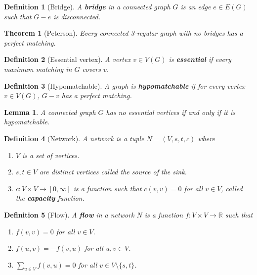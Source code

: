 \documentclass{article}
\newcommand{\R}{\mathbb{R}}
\newcommand{\st}{such that }
\newtheorem*{definition}{Definition}
\newtheorem*{lemma}{Lemma}
\newtheorem*{theorem}{Theorem}
\begin{document}
\begin{definition}[Bridge]
    A \textbf{bridge} in a connected graph $ G $ is an edge $ e \in E(G) $ \st $ G - e $ is disconnected.
\end{definition}

\begin{theorem}[Peterson]
    Every connected 3-regular graph with no bridges has a perfect matching.
\end{theorem}

\begin{definition}[Essential vertex]
    A vertex $ v \in V(G) $ is \textbf{essential} if every maximum matching in $ G $ covers $ v $.
\end{definition}

\begin{definition}[Hypomatchable]
    A graph is \textbf{hypomatchable} if for every vertex $ v \in V(G) $, $ G - v $ has a perfect matching.
\end{definition}

\begin{lemma}
    A connected graph $ G $ has no essential vertices if and only if it is hypomatchable.
\end{lemma}

\begin{definition}[Network]
    A network is a tuple $ N = (V, s, t, c) $ where
    \begin{enumerate}
        \item $ V $ is a set of vertices.
        \item $ s, t \in V $ are distinct vertices called the source of the sink.
        \item $ c: V \times V \to [0, \infty]$ is a function \st $ c(v, v) =0 $ for all $ v \in V $, called the \textbf{capacity} function.
    \end{enumerate}
\end{definition}

\begin{definition}[Flow]
    A \textbf{flow} in a network $ N $ is a function $ f: V \times V \to \R $ \st
    \begin{enumerate}
        \item $ f(v,v) = 0 $ for all $ v \in V $.
        \item $ f(u,v) = -f(v,u) $ for all $ u,v \in V $.
        \item $ \sum_{u \in V}^{}f(v,u) = 0 $ for all $ v \in V \setminus \{s,t\} $.
    \end{enumerate}
\end{definition}
\end{document}
